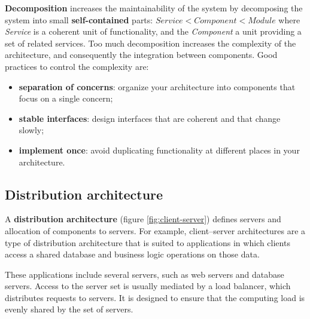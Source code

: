 \textbf{Decomposition} increases the maintainability of the system by decomposing the system into small \textbf{self-contained} parts: $Service < Component < Module$ where \textit{Service} is a coherent unit of functionality, and the \textit{Component} a unit providing a set of related services.
Too much decomposition increases the complexity of the architecture, and consequently the integration between components. Good practices to control the complexity are:
\begin{itemize}
   \item \textbf{separation of concerns}: organize your architecture into components that focus on a single concern;
   \item \textbf{stable interfaces}: design interfaces that are coherent and that change slowly;
   \item \textbf{implement once}: avoid duplicating functionality at different places in your architecture.
\end{itemize}
\subsection{Distribution architecture}
A \textbf{distribution architecture} (figure \ref{fig:client-server}) defines servers and allocation of components to servers. For example, client–server architectures are a type of distribution architecture that is suited to applications in which clients access a shared database and business logic operations on those data.

These applications include several servers, such as web servers and database servers. Access to the server set is usually mediated by a load balancer, which distributes requests to servers. It is designed to ensure that the computing load is evenly shared by the set of servers.

